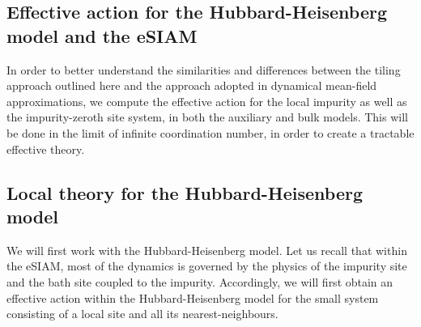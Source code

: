 \documentclass[reprint,hidelinks]{revtex4-2}
\begin{document}
\appendix
\begin{widetext}
\section{Effective action for the Hubbard-Heisenberg model and the eSIAM}
In order to better understand the similarities and differences between the tiling approach outlined here and the approach adopted in dynamical mean-field approximations, we compute the effective action for the local impurity as well as the impurity-zeroth site system, in both the auxiliary and bulk models. This will be done in the limit of infinite coordination number, in order to create a tractable effective theory.

\subsection{Local theory for the Hubbard-Heisenberg model}
We will first work with the Hubbard-Heisenberg model. Let us recall that within the eSIAM, most of the dynamics is governed by the physics of the impurity site and the bath site coupled to the impurity. Accordingly, we will first obtain an effective action within the Hubbard-Heisenberg model for the small system consisting of a local site and all its nearest-neighbours. 


\end{widetext}
\end{document}

